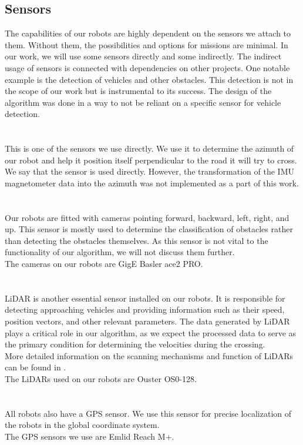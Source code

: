     \subsection{Sensors}
        The capabilities of our robots are highly dependent on the sensors we attach to them. Without them, the possibilities and options for missions are minimal. In our work, we will use some sensors directly and some indirectly. The indirect usage of sensors is connected with dependencies on other projects. One notable example is the detection of vehicles and other obstacles. This detection is not in the scope of our work but is instrumental to its success. The design of the algorithm was done in a way to not be reliant on a specific sensor for vehicle detection.\\\\
        \\
            This is one of the sensors we use directly. We use it to determine the azimuth of our robot and help it position itself perpendicular to the road it will try to cross.\\
            We say that the sensor is used directly. However, the transformation of the IMU magnetometer data into the azimuth was not implemented as a part of this work.\\\\
        \\
            Our robots are fitted with cameras pointing forward, backward, left, right, and up. This sensor is mostly used to determine the classification of obstacles rather than detecting the obstacles themselves. As this sensor is not vital to the functionality of our algorithm, we will not discuss them further.\\
            The cameras on our robots are GigE Basler ace2 PRO.\\\\
        \\
            LiDAR is another essential sensor installed on our robots. It is responsible for detecting approaching vehicles and providing information such as their speed, position vectors, and other relevant parameters. The data generated by LiDAR plays a critical role in our algorithm, as we expect the processed data to serve as the primary condition for determining the velocities during the crossing.\\
            More detailed information on the scanning mechanisms and function of LiDARs can be found in \cite{LiDAR}.\\
            The LiDARs used on our robots are Ouster OS0-128.\\\\
        \\
            All robots also have a GPS sensor. We use this sensor for precise localization of the robots in the global coordinate system.\\
            The GPS sensors we use are Emlid Reach M+.
